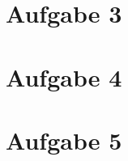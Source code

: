\documentclass[a4paper]{article}
\begin{document}
\section*{Aufgabe 3}
\section*{Aufgabe 4}
\section*{Aufgabe 5}
\end{document}
